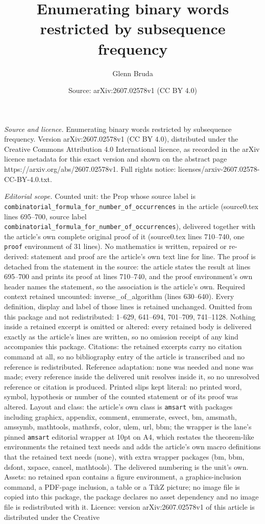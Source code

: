 \documentclass[10pt,a4paper]{amsart}
\title[Enumerating binary words restricted by subsequence frequency]{Enumerating binary words restricted by subsequence frequency}
\author{Glenn Bruda}
\date{Source: arXiv:2607.02578v1 (CC BY 4.0)}
\begin{document}
\maketitle

\noindent\emph{Source and licence.} Enumerating binary words restricted by subsequence frequency. Version arXiv:2607.02578v1 (CC BY 4.0), distributed under the Creative Commons Attribution 4.0 International licence, as recorded in the arXiv licence metadata for this exact version and shown on the abstract page https://arxiv.org/abs/2607.02578v1. Full rights notice: licenses/arxiv-2607.02578-CC-BY-4.0.txt.\par\smallskip

\noindent\textit{Editorial scope.} Counted unit: the Prop whose source label is \texttt{combinatorial\_formula\_for\_number\_of\_occurrences} in the article (source0.tex lines 695--700, source label \texttt{combinatorial\_formula\_for\_number\_of\_occurrences}), delivered together with the article's own complete original proof of it (source0.tex lines 710--740, one \texttt{proof} environment of 31 lines). No mathematics is written, repaired or re-derived: statement and proof are the article's own text line for line. The proof is detached from the statement in the source: the article states the result at lines 695--700 and prints its proof at lines 710--740, and the proof environment's own header names the statement, so the association is the article's own. Required context retained uncounted: inverse\_of\_algorithm (lines 630--640). Every definition, display and label of those lines is retained unchanged. Omitted from this package and not redistributed: 1--629, 641--694, 701--709, 741--1128. Nothing inside a retained excerpt is omitted or altered: every retained body is delivered exactly as the article's lines are written, so no omission receipt of any kind accompanies this package. Citations: the retained excerpts carry no citation command at all, so no bibliography entry of the article is transcribed and no reference is redistributed. Reference adaptation: none was needed and none was made; every reference inside the delivered unit resolves inside it, so no unresolved reference or citation is produced. Printed slips kept literal: no printed word, symbol, hypothesis or number of the counted statement or of its proof was altered. Layout and class: the article's own class is \texttt{amsart} with packages including graphicx, appendix, comment, enumerate, esvect, bm, amsmath, amssymb, mathtools, mathrsfs, color, ulem, url, bbm; the wrapper is the lane's pinned \texttt{amsart} editorial wrapper at 10pt on A4, which restates the theorem-like environments the retained text needs and adds the article's own macro definitions that the retained text needs (none), with extra wrapper packages (bm, bbm, dsfont, xspace, cancel, mathtools). The delivered numbering is the unit's own. Assets: no retained span contains a figure environment, a graphics-inclusion command, a PDF-page inclusion, a table or a TikZ picture; no image file is copied into this package, the package declares no asset dependency and no image file is redistributed with it. Licence: version arXiv:2607.02578v1 of this article is distributed under the Creative 
\end{document}
